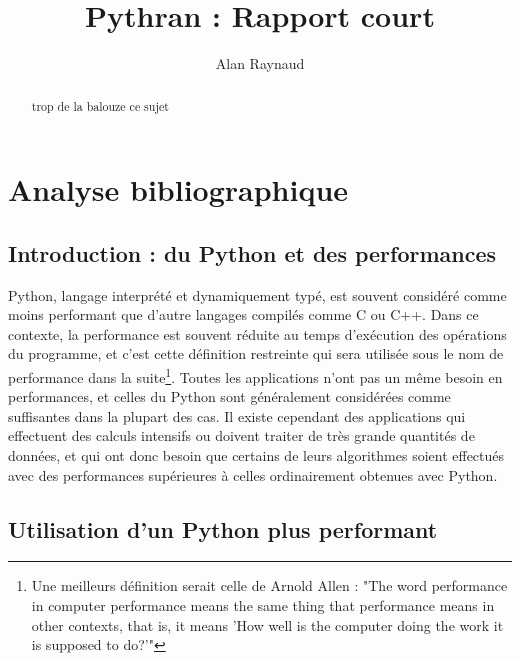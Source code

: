 \documentclass[a4paper]{article}
\title{Pythran : Rapport court}
\author{Alan Raynaud}
\date{}
\begin{document}

\maketitle   
\begin{abstract}
    trop de la balouze ce sujet
\end{abstract}

\clearpage               

\tableofcontents            

\clearpage

\section{Analyse bibliographique}             

\subsection{Introduction : du Python et des performances}

Python, langage interprété et dynamiquement typé, est souvent
considéré comme moins performant que d'autre langages compilés comme C
ou C++. Dans ce contexte, la performance est souvent réduite au temps
d'exécution des opérations du programme, et c'est cette définition
restreinte qui sera utilisée sous le nom de performance dans la
suite\footnote{Une meilleurs définition serait celle de Arnold Allen :
  "The word performance in computer performance means the same thing
  that performance means in other contexts, that is, it means 'How
  well is the computer doing the work it is supposed to
  do?'"\cite{Allen}}. Toutes les applications n'ont pas un même besoin
en performances, et celles du Python sont généralement considérées
comme suffisantes dans la plupart des cas. Il existe cependant des
applications qui effectuent des calculs intensifs ou doivent traiter
de très grande quantités de données, et qui ont donc besoin que
certains de leurs algorithmes soient effectués avec des performances
supérieures à celles ordinairement obtenues avec Python.

\subsection{Utilisation d'un Python plus performant}
\end{document}
